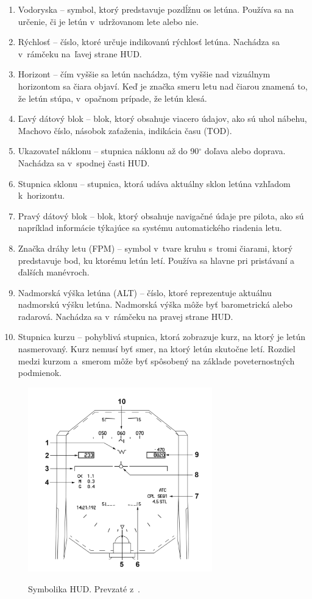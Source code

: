 \begin{enumerate}
    \item Vodoryska – symbol, ktorý predstavuje pozdĺžnu os letúna. Používa sa na určenie, či je letún v~udržovanom lete alebo nie.
    \item Rýchlosť – číslo, ktoré určuje indikovanú rýchlosť letúna. Nachádza sa v~rámčeku na~ľavej strane HUD.
    \item Horizont – čím vyššie sa letún nachádza, tým vyššie nad vizuálnym horizontom sa čiara objaví. Keď je značka smeru letu nad čiarou znamená to, že letún stúpa, v~opačnom prípade, že letún klesá. 
    \item Ľavý dátový blok – blok, ktorý obsahuje viacero údajov, ako sú uhol nábehu, Machovo číslo, násobok zaťaženia, indikácia času (TOD).
    \item Ukazovateľ náklonu – stupnica náklonu až do 90$^\circ$ doľava alebo doprava. Nachádza sa v~spodnej časti HUD.
    \item Stupnica sklonu – stupnica, ktorá udáva aktuálny sklon letúna vzhľadom k~horizontu.
    \item Pravý dátový blok – blok, ktorý obsahuje navigačné údaje pre pilota, ako sú napríklad informácie týkajúce sa systému automatického riadenia letu.
    \item Značka dráhy letu (FPM) – symbol v~tvare kruhu s~tromi čiarami, ktorý predstavuje bod, ku ktorému letún letí. Používa sa hlavne pri pristávaní a ďalších manévroch. 
    \item Nadmorská výška letúna (ALT) – číslo, ktoré reprezentuje aktuálnu nadmorskú výšku letúna. Nadmorská výška môže byť barometrická alebo radarová. Nachádza sa v~rámčeku na pravej strane HUD.
    \item Stupnica kurzu – pohyblivá stupnica, ktorá zobrazuje kurz, na ktorý je letún nasmerovaný. Kurz nemusí byť smer, na ktorý letún skutočne letí. Rozdiel medzi kurzom a~smerom môže byť spôsobený na základe poveternostných podmienok.
\end{enumerate}

\begin{figure}[ht]
\centering
\includegraphics[height=8cm, width=8cm]{obrazky-figures/symbolikaHUD.png}
\caption{Symbolika HUD. Prevzaté z~\cite{fotoCS}.}{\label{symbolika}}
\end{figure}

